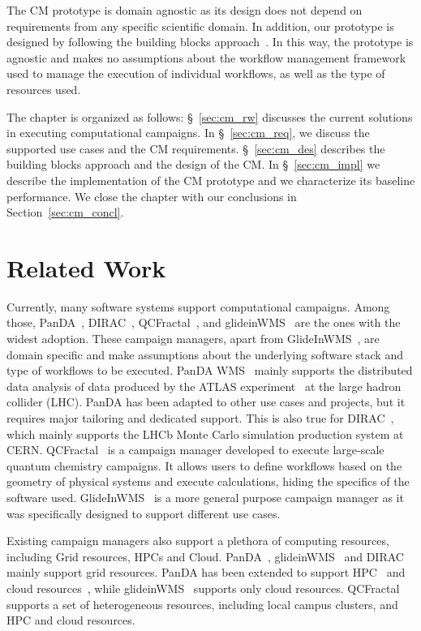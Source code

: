 The CM prototype is domain agnostic as its design does not depend
on requirements from any specific scientific domain. In addition, our prototype
is designed by following the building blocks
approach~\cite{turilli2019middleware}. In this way, the prototype is agnostic
and makes no assumptions about the workflow management framework used to manage
the execution of individual workflows, as well as the type of resources used.

The chapter is organized as follows: \S~\ref{sec:cm_rw} discusses the current
solutions in executing computational campaigns. In \S~\ref{sec:cm_req}, we 
discuss the supported use cases and the CM requirements. 
\S~\ref{sec:cm_des} describes the building blocks approach and the design of 
the CM. In \S~\ref{sec:cm_impl} we describe the implementation of the CM 
prototype and we characterize its baseline performance. We close the chapter 
with our conclusions in Section~\ref{sec:cm_concl}.

\section{Related Work}

Currently, many software systems support computational campaigns. Among those,
PanDA~\cite{maeno2008panda}, DIRAC~\cite{casajus2010dirac},
QCFractal~\cite{qcfractal}, and glideinWMS~\cite{sfiligoi2008glidein} are the
ones with the widest adoption. These campaign managers, apart from
GlideInWMS~\cite{sfiligoi2008glidein}, are domain specific and make assumptions
about the underlying software stack and type of workflows to be executed. PanDA
WMS~\cite{maeno2008panda} mainly supports the distributed data analysis of data
produced by the ATLAS experiment~\cite{atlas} at the large hadron collider
(LHC). PanDA has been adapted to other use cases and projects, but it requires
major tailoring and dedicated support. This is also true for
DIRAC~\cite{tsaregorodtsev2003dirac}, which mainly supports the LHCb Monte Carlo
simulation production system at CERN. QCFractal~\cite{qcfractal} is a campaign
manager developed to execute large-scale quantum chemistry campaigns. It allows
users to define workflows based on the geometry of physical systems and execute
calculations, hiding the specifics of the software used.
GlideInWMS~\cite{sfiligoi2008glidein} is a more general purpose campaign manager
as it was specifically designed to support different use cases.

Existing campaign managers also support a plethora of computing resources,
including Grid resources, HPCs and Cloud. PanDA~\cite{maeno2008panda},
glideinWMS~\cite{sfiligoi2008glidein} and DIRAC~\cite{casajus2010dirac} mainly
support grid resources. PanDA has been extended to support
HPC~\cite{de2015future, de2016accelerating} and cloud
resources~\cite{de2016accelerating}, while glideinWMS~\cite{sfiligoi2008glidein}
supports only cloud resources. QCFractal~\cite{qcfractal} supports a set of
heterogeneous resources, including local campus clusters, and HPC and
cloud resources.

